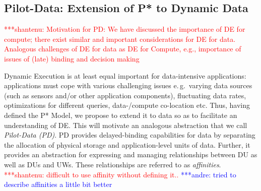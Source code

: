\documentclass[conference,final]{IEEEtran}
\newcommand{\jhanote}[1]{ {\textcolor{red} { ***shantenu: #1 }}}
\newcommand{\alnote}[1]{ {\textcolor{blue} { ***andre: #1 }}}
\newcommand{\alnote}[1]{}
\newcommand{\jhanote}[1]{}
\newcommand{\upp}{\vspace*{-0.5em}}
\begin{document}
\subsection{Pilot-Data: Extension of P* to Dynamic Data\upp\upp}
\label{sec:pilot-data}







\jhanote{Motivation for PD: We have discussed the importance of DE for
  compute; there exist similar and important considerations for DE for
  data. Analogous challenges of DE for data as DE for Compute, e.g.,
  importance of issues of (late) binding and decision making} 

Dynamic Execution is at least equal important for data-intensive applications:
applications must cope with various challenging issues e.\,g.\ varying data
sources (such as sensors and/or other application components), fluctuating data
rates, optimizations for different queries, data-/compute co-location etc. Thus,
having defined the P* Model, we propose to extend it to data so as to facilitate
an understanding of DE. This will motivate an analogous abstraction that we call
\emph{Pilot-Data (PD)}. PD provides delayed-binding capabilities for data by
separating the allocation of physical storage and application-level units of
data. Further, it provides an abstraction for expressing and managing
relationships between DU as well as DUs and UWs. These relationships are
referred to as
\emph{affinities}.
\jhanote{difficult to use affinity
  without defining it..}
\alnote{tried to describe affinities a little bit better}
\end{document}
